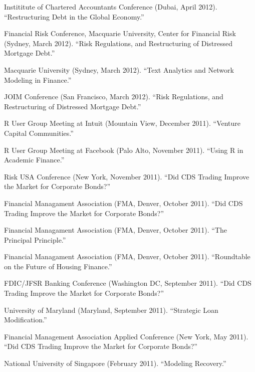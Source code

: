 \documentclass{article}
\begin{document}
\begin{etaremune}
{\item Instititute of Chartered Accountants Conference (Dubai, April 2012). 
``Restructuring Debt in the Global Economy.''

\item Financial Risk Conference, Macquarie University, Center for Financial Risk (Sydney, March 2012).
``Risk Regulations, and Restructuring of Distressed Mortgage Debt.''

\item Macquarie University (Sydney, March 2012).
``Text Analytics and Network Modeling in Finance.''

\item JOIM Conference (San Francisco, March 2012).
``Risk Regulations, and Restructuring of Distressed Mortgage Debt.''

\item R User Group Meeting at Intuit (Mountain View, December 2011). 
``Venture Capital Communities.''

\item R User Group Meeting at Facebook (Palo Alto, November 2011).
``Using R in Academic Finance.''

\item Risk USA Conference (New York, November 2011).
``Did CDS Trading Improve the Market for Corporate Bonds?''

\item Financial Managament Association (FMA, Denver, October 2011).
``Did CDS Trading Improve the Market for Corporate Bonds?''

\item Financial Managament Association (FMA, Denver, October 2011).
``The Principal Principle.''

\item Financial Managament Association (FMA, Denver, October 2011).
``Roundtable on the Future of Housing Finance.''

\item FDIC/JFSR Banking Conference (Washington DC, September 2011). 
``Did CDS Trading Improve the Market for Corporate Bonds?''

\item University of Maryland (Maryland, September 2011). 
``Strategic Loan Modification.''

\item Financial Management Association Applied Conference (New York, May 2011). 
``Did CDS Trading Improve the Market for Corporate Bonds?''

\item National University of Singapore (February 2011). 
``Modeling Recovery.''

}
\end{etaremune}
\end{document}
